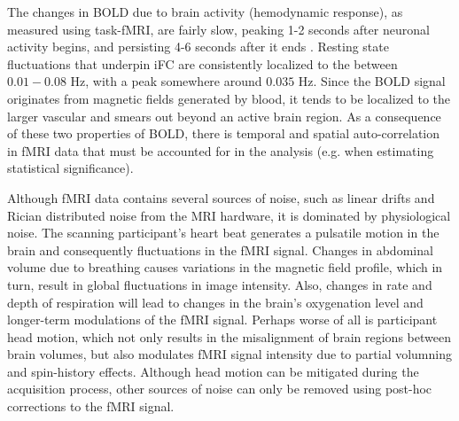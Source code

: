 The changes in BOLD due to brain activity (hemodynamic response), as measured using task-fMRI, are fairly slow, peaking 1-2 seconds after neuronal activity begins, and persisting 4-6 seconds after it ends \cite{fmribook}. Resting state fluctuations that underpin iFC are consistently localized to the between $0.01-0.08$ \si{\hertz}, with a peak somewhere around $0.035$ \si{\hertz}\cite{biswal,cordes}. Since the BOLD signal originates from magnetic fields generated by blood, it tends to be localized to the larger vascular and smears out beyond an active brain region. As a consequence of these two properties of BOLD, there is temporal and spatial auto-correlation in fMRI data that must be accounted for in the analysis (e.g. when estimating statistical significance).

Although fMRI data contains several sources of noise, such as linear drifts and Rician distributed noise from the MRI hardware\cite{Gudbjartsson1995}, it is dominated by physiological noise. The scanning participant's heart beat generates a pulsatile motion in the brain and consequently fluctuations in the fMRI signal\cite{birn2012}. Changes in abdominal volume due to breathing causes variations in the magnetic field profile, which in turn, result in global fluctuations in image intensity\cite{birn2012}. Also, changes in rate and depth of respiration will lead to changes in the brain's oxygenation level and longer-term modulations of the fMRI signal\cite{birn2012}. Perhaps worse of all is participant head motion, which not only results in the misalignment of brain regions between brain volumes, but also modulates fMRI signal intensity due to partial volumning and spin-history effects. Although head motion can be mitigated during the acquisition process, other sources of noise can only be removed using post-hoc corrections to the fMRI signal.


